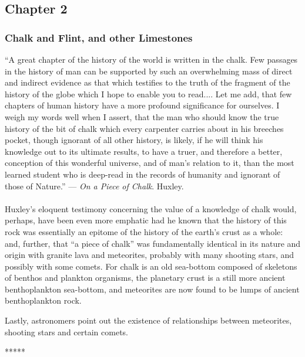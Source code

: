 \documentclass[a4paper, 12pt, oneside]{article}
\begin{document}
\subsection{Chapter 2}
\subsubsection{Chalk and Flint, and other Limestones}
\begin{displayquote}
``A great chapter of the history of the world is written in the chalk. Few passages in the history of man can be supported by such an overwhelming mass of direct and indirect evidence as that which testifies to the truth of the fragment of the history of the globe which I hope to enable you to read.... Let me add, that few chapters of human history have a more profound significance for ourselves. I weigh my words well when I assert, that the man who should know the true history of the bit of chalk which every carpenter carries about in his breeches pocket, though ignorant of all other history, is likely, if he will think his knowledge out to its ultimate results, to have a truer, and therefore a better, conception of this wonderful universe, and of man's relation to it, than the most learned student who is deep-read in the records of humanity and ignorant of those of Nature.'' --- \emph{On a Piece of Chalk}. Huxley.
\end{displayquote}
\paragraph{}
Huxley's eloquent testimony concerning the value of a knowledge of chalk would, perhaps, have been even more emphatic had he known that the history of this rock was essentially an epitome of the history of the earth's crust as a whole: and, further, that ``a piece of chalk'' was fundamentally identical in its nature and origin with granite lava and meteorites, probably with many shooting stars, and possibly with some comets. For chalk is an old sea-bottom composed of skeletons of benthos and plankton organisms, the planetary crust is a still more ancient benthoplankton sea-bottom, and meteorites are now found to be lumps of ancient benthoplankton rock.

Lastly, astronomers point out the existence of relationships between meteorites, shooting stars and certain comets.

\centerline{*\hspace{15mm}*\hspace{15mm}*\hspace{15mm}*\hspace{15mm}*}
\bigskip
\end{document}
